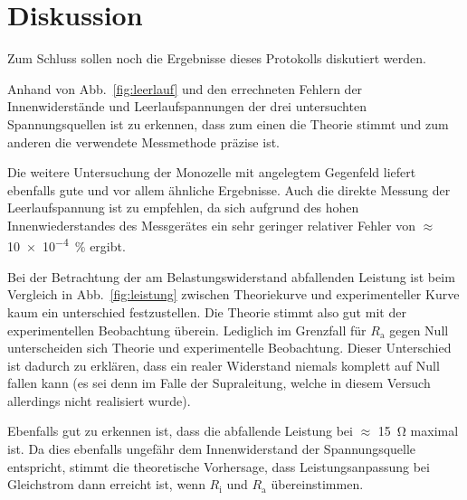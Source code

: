 
\section{Diskussion}
Zum Schluss sollen noch die Ergebnisse dieses Protokolls diskutiert werden.

Anhand von Abb.~\ref{fig:leerlauf} und den errechneten Fehlern der 
Innenwiderstände und Leerlaufspannungen der drei untersuchten 
Spannungsquellen ist zu erkennen, dass zum einen die Theorie stimmt und 
zum anderen die verwendete Messmethode präzise ist.

Die weitere Untersuchung der Monozelle mit angelegtem Gegenfeld liefert 
ebenfalls gute und vor allem ähnliche Ergebnisse. 
Auch die direkte Messung der Leerlaufspannung ist zu empfehlen, da 
sich aufgrund des hohen Innenwiederstandes des Messgerätes ein
sehr geringer relativer Fehler von $\approx$ \SI{10e-4}{\percent} 
ergibt.

Bei der Betrachtung der am Belastungswiderstand abfallenden Leistung 
ist beim Vergleich in Abb.~\ref{fig:leistung} zwischen Theoriekurve und 
experimenteller Kurve kaum ein unterschied festzustellen. Die Theorie 
stimmt also gut mit der experimentellen Beobachtung überein. Lediglich 
im Grenzfall für $R_\text{a}$ gegen Null unterscheiden sich Theorie und 
experimentelle Beobachtung. Dieser Unterschied ist dadurch zu erklären, 
dass ein realer Widerstand niemals komplett auf Null fallen kann (es sei 
denn im Falle der Supraleitung, welche in diesem Versuch allerdings nicht 
realisiert wurde).

Ebenfalls gut zu erkennen ist, dass die abfallende Leistung bei $\approx$ 
\SI{15}{\ohm} maximal ist. Da dies ebenfalls ungefähr dem Innenwiderstand 
der Spannungsquelle entspricht, stimmt die theoretische Vorhersage, dass 
Leistungsanpassung bei Gleichstrom dann erreicht ist, wenn $R_\text{i}$ 
und $R_\text{a}$ übereinstimmen.